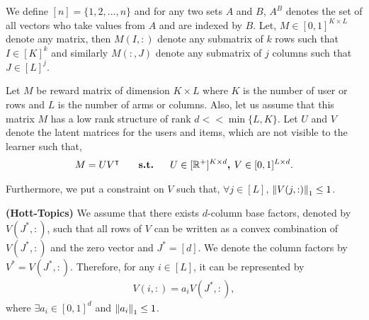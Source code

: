 We define $[n] = \lbrace 1,2,\ldots, n\rbrace$ and for any two sets $A$ and $B$, $A^B$ denotes the set of all vectors who take values from $A$ and are indexed by $B$. Let, $M\in [0,1]^{K\times L}$ denote any matrix, then $M(I,:)$ denote any submatrix of $k$ rows such that $I\in[K]^k$ and similarly $M(:,J)$ denote any submatrix of $j$ columns such that $J\in[L]^{j}$.
	
	Let $M$ be reward matrix of  dimension $K\times L$ where $K$ is the number of user or rows and $L$ is the number of arms or columns. Also, let us assume that this matrix  $M$ has a low rank structure of rank $d << \min\lbrace L,K\rbrace$. Let $U$ and $V$ denote the latent matrices for the users and items, which are not visible to the learner such that,
\begin{align*}
	M = UV^{\intercal} \textbf{ \hspace*{4mm}   s.t.   \hspace*{4mm}} U\in [ \mathbb{R}^+ ]^{K\times d} \textbf{, } V\in  [0,1]^{L\times d}.
\end{align*}	  
	
	Furthermore, we put a constraint on $V$ such that, $\forall j\in [L]$, $ \left\lVert V(j,:)\right\rVert_1 \leq 1$. 
	
	
\begin{assumption}\textbf{(Hott-Topics)}
\label{assm:hott-topics}
We assume that there exists $d$-column base factors, denoted by $V(J^*,:)$, such that all rows of $V$ can be written as a convex combination of $V(J^*,:)$ and the zero vector and $J^* = [d]$. We denote the column factors by $V^* = V(J^*,:)$. Therefore, for any $i\in [L]$, it can be represented by
\begin{align*}
V(i,:) = a_i V(J^*,:) , 
\end{align*}
where $\exists a_i\in [0,1]^{d}$ and $ \left\lVert a_i\right\rVert_1 \leq 1$.
\end{assumption}




